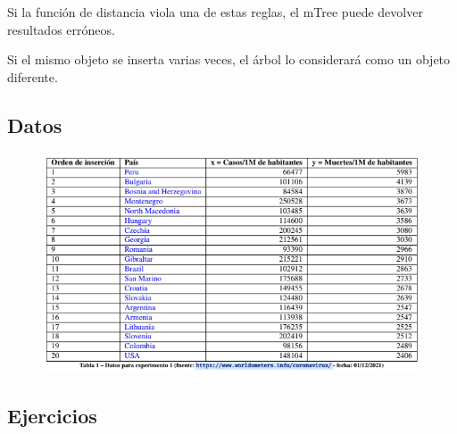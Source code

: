 \documentclass[a4paper]{article}
\begin{document}
Si la función de distancia viola una de estas reglas, el mTree puede devolver resultados erróneos.

Si el mismo objeto se inserta varias veces, el árbol lo considerará como un objeto diferente.





\subsection{Datos}

\begin{figure}[H]
  \centering
  \includegraphics[width=1\textwidth]{imagenes/Captura de pantalla de 2021-12-15 13-58-05.png}
\end{figure}





\subsection{Ejercicios}
\end{document}
